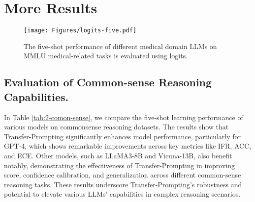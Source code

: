 

\section{More Results}
\label{sec:more_results}


\begin{figure*}[!h]
\centering
\texttt{[image: Figures/logits-five.pdf]}
\hfill
\caption{The five-shot performance of different medical domain LLMs on MMLU medical-related tasks is evaluated using logits.}
\label{fig: logits-five}
\end{figure*}





\subsection{Evaluation of Common-sense Reasoning Capabilities.}
In Table \ref{tab:2-comon-sense}, we compare the five-shot learning performance of various models on commonsense reasoning datasets. 
The results show that Transfer-Prompting significantly enhances model performance, particularly for GPT-4, which shows remarkable improvements across key metrics like IFR, ACC, and ECE. Other models, such as LLaMA3-8B and Vicuna-13B, also benefit notably, demonstrating the effectiveness of Transfer-Prompting in improving score, confidence calibration, and generalization across different common-sense reasoning tasks. These results underscore Transfer-Prompting's robustness and potential to elevate various LLMs' capabilities in complex reasoning scenarios.

